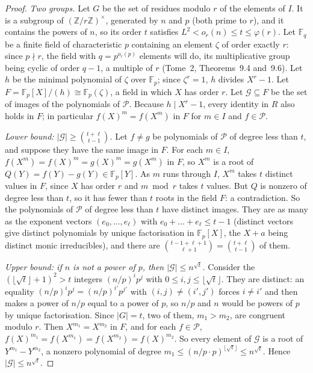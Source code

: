 \begin{proof}
\emph{Two groups.} Let $G$ be the set of residues modulo $r$ of the elements of $I$. It is a subgroup of $(\mathbb Z/r\mathbb Z)^\times$, generated by $n$ and $p$ (both prime to $r$), and it contains the powers of $n$, so its order $t$ satisfies $L^2<o_r(n)\le t\le\varphi(r)$.
Let $\mathbb F_q$ be a finite field of characteristic $p$ containing an element $\zeta$ of order exactly $r$: since $p\nmid r$, the field with $q=p^{o_r(p)}$ elements will do, its multiplicative group being cyclic of order $q-1$, a multiple of $r$ (Tome~2, Theorems~9.4 and~9.6). Let $h$ be the minimal polynomial of $\zeta$ over $\mathbb F_p$; since $\zeta^r=1$, $h$ divides $X^r-1$. Let $F=\mathbb F_p[X]/(h)\cong\mathbb F_p(\zeta)$, a field in which $X$ has order $r$.
Let $\mathcal G\subseteq F$ be the set of images of the polynomials of $\mathcal P$. Because $h\mid X^r-1$, every identity in $R$ also holds in $F$; in particular $f(X)^m=f(X^m)$ in $F$ for $m\in I$ and $f\in\mathcal P$.

\emph{Lower bound: $|\mathcal G|\ge\binom{t+\ell}{t-1}$.} Let $f\ne g$ be polynomials of $\mathcal P$ of degree less than $t$, and suppose they have the same image in $F$. For each $m\in I$, $f(X^m)=f(X)^m=g(X)^m=g(X^m)$ in $F$, so $X^m$ is a root of $Q(Y)=f(Y)-g(Y)\in\mathbb F_p[Y]$. As $m$ runs through $I$, $X^m$ takes $t$ distinct values in $F$, since $X$ has order $r$ and $m\bmod r$ takes $t$ values. But $Q$ is nonzero of degree less than $t$, so it has fewer than $t$ roots in the field $F$: a contradiction.
So the polynomials of $\mathcal P$ of degree less than $t$ have distinct images. They are as many as the exponent vectors $(e_0,\dots,e_\ell)$ with $e_0+\dots+e_\ell\le t-1$ (distinct vectors give distinct polynomials by unique factorisation in $\mathbb F_p[X]$, the $X+a$ being distinct monic irreducibles), and there are $\binom{t-1+\ell+1}{\ell+1}=\binom{t+\ell}{t-1}$ of them.

\emph{Upper bound: if $n$ is not a power of $p$, then $|\mathcal G|\le n^{\sqrt t}$.} Consider the $(\lfloor\sqrt t\rfloor+1)^2>t$ integers $(n/p)^ip^j$ with $0\le i,j\le\lfloor\sqrt t\rfloor$. They are distinct: an equality $(n/p)^ip^j=(n/p)^{i'}p^{j'}$ with $(i,j)\ne(i',j')$ forces $i\ne i'$ and then makes a power of $n/p$ equal to a power of $p$, so $n/p$ and $n$ would be powers of $p$ by unique factorisation. Since $|G|=t$, two of them, $m_1>m_2$, are congruent modulo $r$.
Then $X^{m_1}=X^{m_2}$ in $F$, and for each $f\in\mathcal P$, $f(X)^{m_1}=f(X^{m_1})=f(X^{m_2})=f(X)^{m_2}$. So every element of $\mathcal G$ is a root of $Y^{m_1}-Y^{m_2}$, a nonzero polynomial of degree $m_1\le(n/p\cdot p)^{\lfloor\sqrt t\rfloor}\le n^{\sqrt t}$. Hence $|\mathcal G|\le n^{\sqrt t}$.


\end{proof}
